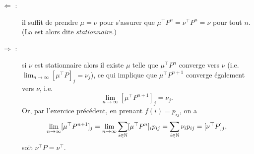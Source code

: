 \proof
\begin{description}
  \item[$\Leftarrow$ :] il suffit de prendre $\mu = \nu$ pour s'assurer que $\mu^\top P^n = \nu^\top P^n = \nu$ pour tout $n$. (La \cM est alors dite {\em stationnaire}.)
  \item[$\Rightarrow$ :] si $\nu$ est stationnaire alors il existe $\mu$ telle que $\mu^\top P^n$ converge vers $\nu$ (i.e. $\lim_{n \to \infty} [\mu^\top P]_j = \nu_j$), ce qui implique que $\mu^\top P^{n+1}$ converge également vers $\nu$, i.e.
  $$
  \lim_{n \to \infty} [\mu^\top P^{n+1}]_j = \nu_j.
  $$
  Or, par l'exercice précédent, en prenant $f(i) = p_{ij}$, on a
  $$
  \lim_{n \to \infty} [\mu^\top P^{n+1}]_j
  = \lim_{n \to \infty} \sum_{i \in \mathbb{N}} [\mu^\top P^n]_i p_{ij}
  = \sum_{i \in \mathbb{N}} \nu_i p_{ij}
  = [\nu^\top P]_j,
  $$
  soit $\nu^\top P = \nu^\top$.
\end{description}
\eproof


